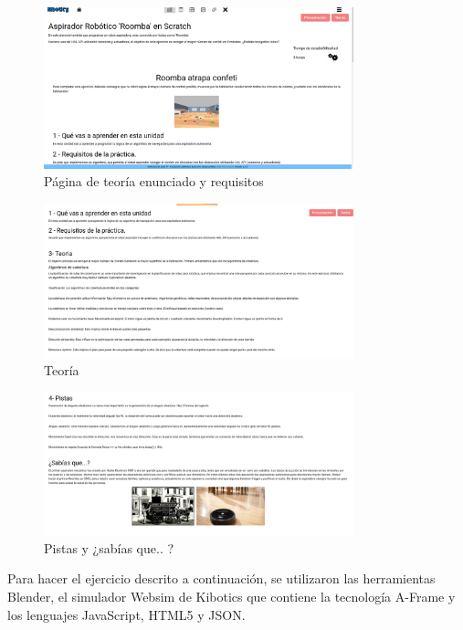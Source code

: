 \begin{figure}[H]
    \centering
    \includegraphics[width=0.8\textwidth, height=0.4\textwidth]{chapters/images/teoria1.png}
    \caption{Página de teoría enunciado y requisitos}
    \label{fig:my_label}
\end{figure}
\begin{figure}[H]
    \centering
    \includegraphics[width=0.8\textwidth, height=0.4\textwidth]{chapters/images/teoria2.png}
    \caption{Teoría}
    \label{fig:my_label}
\end{figure}
\begin{figure}[H]
    \centering
    \includegraphics[width=0.8\textwidth, height=0.4\textwidth]{chapters/images/teoria3.png}
    \caption{Pistas y ¿sabías que.. ?}
    \label{fig:my_label}
\end{figure}

Para hacer el ejercicio descrito a continuación, se utilizaron las herramientas Blender, el simulador Websim de Kibotics que contiene la tecnología A-Frame y los lenguajes JavaScript, HTML5 y JSON.

